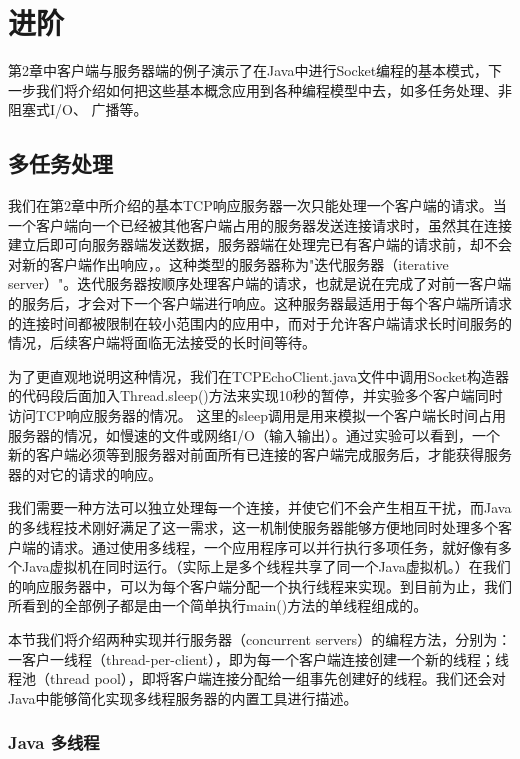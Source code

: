 \chapter{进阶}

第2章中客户端与服务器端的例子演示了在Java中进行Socket编程的基本模式，下一步我们将介绍如何把这些基本概念应用到各种编程模型中去，如多任务处理、非阻塞式I/O、
广播等。 

\section{多任务处理} 

	我们在第2章中所介绍的基本TCP响应服务器一次只能处理一个客户端的请求。当一个客户端向一个已经被其他客户端占用的服务器发送连接请求时，虽然其在连接建立后即可向服务器端发送数据，服务器端在处理完已有客户端的请求前，却不会对新的客户端作出响应，。这种类型的服务器称为"迭代服务器（iterative server）"。迭代服务器按顺序处理客户端的请求，也就是说在完成了对前一客户端的服务后，才会对下一个客户端进行响应。这种服务器最适用于每个客户端所请求的连接时间都被限制在较小范围内的应用中，而对于允许客户端请求长时间服务的情况，后续客户端将面临无法接受的长时间等待。 

	为了更直观地说明这种情况，我们在TCPEchoClient.java文件中调用Socket构造器的代码段后面加入Thread.sleep()方法来实现10秒的暂停，并实验多个客户端同时访问TCP响应服务器的情况。 这里的sleep调用是用来模拟一个客户端长时间占用服务器的情况，如慢速的文件或网络I/O（输入输出）。通过实验可以看到，一个新的客户端必须等到服务器对前面所有已连接的客户端完成服务后，才能获得服务器的对它的请求的响应。 

	我们需要一种方法可以独立处理每一个连接，并使它们不会产生相互干扰，而Java的多线程技术刚好满足了这一需求，这一机制使服务器能够方便地同时处理多个客户端的请求。通过使用多线程，一个应用程序可以并行执行多项任务，就好像有多个Java虚拟机在同时运行。（实际上是多个线程共享了同一个Java虚拟机。）在我们的响应服务器中，可以为每个客户端分配一个执行线程来实现。到目前为止，我们所看到的全部例子都是由一个简单执行main()方法的单线程组成的。 

	本节我们将介绍两种实现并行服务器（concurrent servers）的编程方法，分别为：一客户一线程（thread-per-client），即为每一个客户端连接创建一个新的线程；线程池（thread pool），即将客户端连接分配给一组事先创建好的线程。我们还会对Java中能够简化实现多线程服务器的内置工具进行描述。 

	\subsection{Java 多线程}

